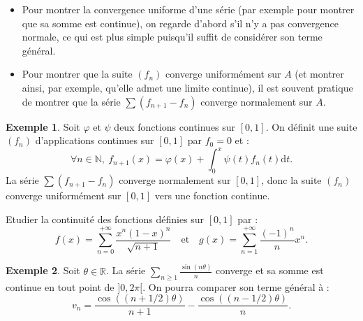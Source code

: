 \documentclass[french]{article}
\newcommand{\N}{\mathbb{N}}
\newcommand{\R}{\mathbb{R}}
\renewcommand{\d}{\text{d}}
\theoremstyle{plain}
\theoremstyle{definition}
\newtheorem*{ex}{Exemple}
\theoremstyle{remark}
\begin{document}
\begin{met}
	\begin{itemize}
		\item Pour montrer la convergence uniforme d'une série (par exemple pour montrer que sa somme est continue), on regarde d'abord s'il n'y a pas convergence normale, ce qui est plus simple puisqu'il suffit de considérer son terme général.
		\item Pour montrer que la suite $(f_n)$ converge uniformément sur $A$ (et montrer ainsi, par exemple, qu'elle admet une limite continue), il est souvent pratique de montrer que la série $\sum (f_{n+1}-f_n)$ converge normalement sur $A$.
	\end{itemize}
\end{met}

\begin{ex}
	Soit $\varphi$ et $\psi$ deux fonctions continues sur $[0,1]$. On définit une suite $(f_n)$ d'applications continues sur $[0,1]$ par $f_0=0$ et :
	$$\forall n\in\N,\ f_{n+1}(x)=\varphi(x)+\int_{0}^{x}\psi(t)f_n(t)\d t.$$
	La série $\displaystyle\sum(f_{n+1}-f_n)$ converge normalement sur $[0,1]$, donc la suite $(f_n)$ converge uniformément sur $[0,1]$ vers une fonction continue.
\end{ex}

\begin{exo}
	Etudier la continuité des fonctions définies sur $[0,1]$ par :
	$$f(x)=\sum_{n=0}^{+\infty}\frac{x^n(1-x)^n}{\sqrt{n+1}}\quad\text{et}\quad g(x)=\sum_{n=1}^{+\infty}\frac{(-1)^n}{n}x^n.$$
\end{exo}

\begin{ex}
	Soit $\theta\in\R$. La série $\displaystyle\sum_{n\geqslant 1}\frac{\sin(n\theta)}{n}$ converge et sa somme est continue en tout point de $]0,2\pi[$. On pourra comparer son terme général à :
	$$v_n=\frac{\cos(\left(n+1/2\right)\theta)}{n+1}-\frac{\cos(\left(n-1/2\right)\theta)}{n}.$$
\end{ex}
\end{document}
